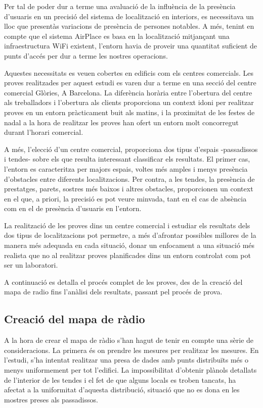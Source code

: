 
Per tal de poder dur a terme una avaluació de la influència de la presència d'usuaris en un precisió del sistema de localització en interiors, es necessitava un lloc que presentàs variacions de presència de persones notables. A més, tenint en compte que el sistema AirPlace es basa en la localització mitjançant una infraestructura WiFi existent, l'entorn havia de proveir una quantitat suficient de punts d'accés per dur a terme les nostres operacions.

Aquestes necessitats es veuen cobertes en edificis com els centres comercials. Les proves realitzades per aquest estudi es varen dur a terme en una secció del centre comercial Glòries, A Barcelona. La diferència horària entre l'obertura del centre als treballadors i l'obertura als clients proporciona un context idoni per realitzar proves en un entorn pràcticament buit als matins, i la proximitat de les festes de nadal a la hora de realitzar les proves han ofert un entorn molt concorregut durant l'horari comercial.

A més, l'elecció d'un centre comercial, proporciona dos tipus d'espais -passadissos i tendes- sobre els que resulta interessant classificar els resultats. El primer cas, l'entorn es caracteritza per majors espais, voltes més amples i menys presència d'obstacles entre diferents localitzacions. Per contra, a les tendes, la presència de prestatges, parets, sostres més baixos i altres obstacles, proporcionen un context en el que, a priori, la precisió es pot veure minvada, tant en el cas de absència com en el de presència d'usuaris en l'entorn.

La realització de les proves dins un centre comercial i estudiar els resultats dels dos tipus de localitzacions pot permetre, a més d'afrontar possibles millores de la manera més adequada en cada situació, donar un enfocament a una situació més realista que no al realitzar proves planificades dins un entorn controlat com pot ser un laboratori.

A continuació es detalla el procés complet de les proves, des de la creació del mapa de radio fins l'anàlisi dels resultats, passant pel procés de prova.

\subsection{Creació del mapa de ràdio}

A la hora de crear el mapa de ràdio s'han hagut de tenir en compte una sèrie de consideracions. La primera és on prendre les mesures per realitzar les mesures. En l'estudi, s'ha intentat realitzar una presa de dades amb punts distribuïts més o menys uniformement per tot l'edifici. La impossibilitat d'obtenir plànols detallats de l'interior de les tendes i el fet de que alguns locals es troben tancats, ha afectat a la uniformitat d'aquesta distribució, situació que no es dona en les mostres preses als passadissos.

